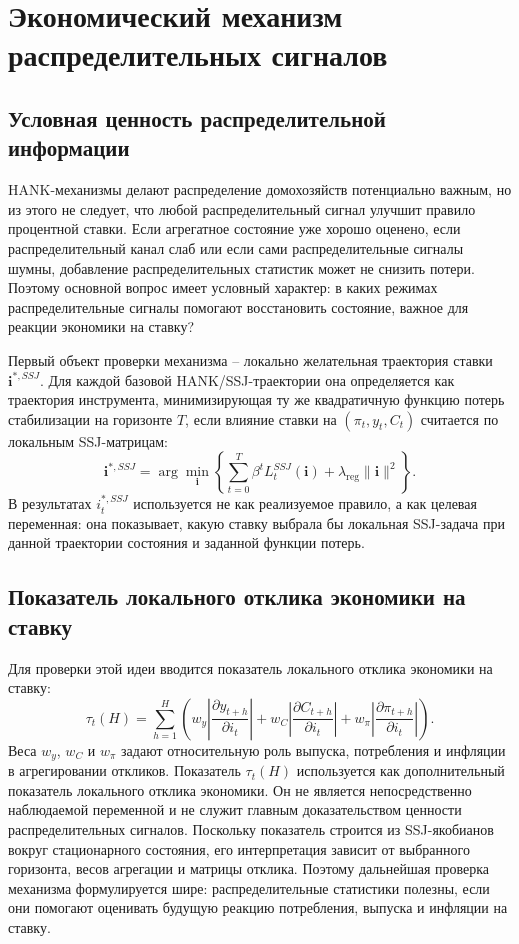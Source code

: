 \section{Экономический механизм распределительных сигналов}

\subsection{Условная ценность распределительной информации}

HANK-механизмы делают распределение домохозяйств потенциально важным, но из этого не следует, что
любой распределительный сигнал улучшит правило процентной ставки. Если агрегатное состояние уже
хорошо оценено, если распределительный канал слаб или если сами распределительные сигналы шумны,
добавление распределительных статистик может не снизить потери. Поэтому основной вопрос имеет
условный характер: в каких режимах распределительные сигналы помогают восстановить состояние,
важное для реакции экономики на ставку?

Первый объект проверки механизма -- локально желательная траектория ставки
\(\mathbf i^{*,SSJ}\). Для каждой базовой HANK/SSJ-траектории она определяется как траектория
инструмента, минимизирующая ту же квадратичную функцию потерь стабилизации на горизонте \(T\),
если влияние ставки на \((\pi_t,y_t,C_t)\) считается по локальным SSJ-матрицам:
\[
\mathbf i^{*,SSJ}
=
\arg\min_{\mathbf i}
\left\{
\sum_{t=0}^{T}
\beta^t L_t^{SSJ}(\mathbf i)
+\lambda_{\mathrm{reg}}\|\mathbf i\|^2
\right\}.
\]
В результатах \(i_t^{*,SSJ}\) используется не как реализуемое правило, а как целевая переменная:
она показывает, какую ставку выбрала бы локальная SSJ-задача при данной траектории состояния и
заданной функции потерь.

\subsection{Показатель локального отклика экономики на ставку}

Для проверки этой идеи вводится показатель локального отклика экономики на ставку:
\[
\tau_t(H)
=
\sum_{h=1}^{H}
\left(
w_y\left|\frac{\partial y_{t+h}}{\partial i_t}\right|
+w_C\left|\frac{\partial C_{t+h}}{\partial i_t}\right|
+w_\pi\left|\frac{\partial \pi_{t+h}}{\partial i_t}\right|
\right).
\]
Веса \(w_y\), \(w_C\) и \(w_\pi\) задают относительную роль выпуска, потребления и инфляции в
агрегировании откликов.
Показатель \(\tau_t(H)\) используется как дополнительный показатель локального отклика экономики.
Он не является непосредственно наблюдаемой переменной и не служит главным доказательством
ценности распределительных сигналов. Поскольку показатель строится из SSJ-якобианов вокруг
стационарного состояния, его интерпретация зависит от выбранного горизонта, весов агрегации и
матрицы отклика. Поэтому дальнейшая проверка механизма формулируется шире:
распределительные статистики полезны, если они помогают оценивать будущую реакцию потребления,
выпуска и инфляции на ставку.

